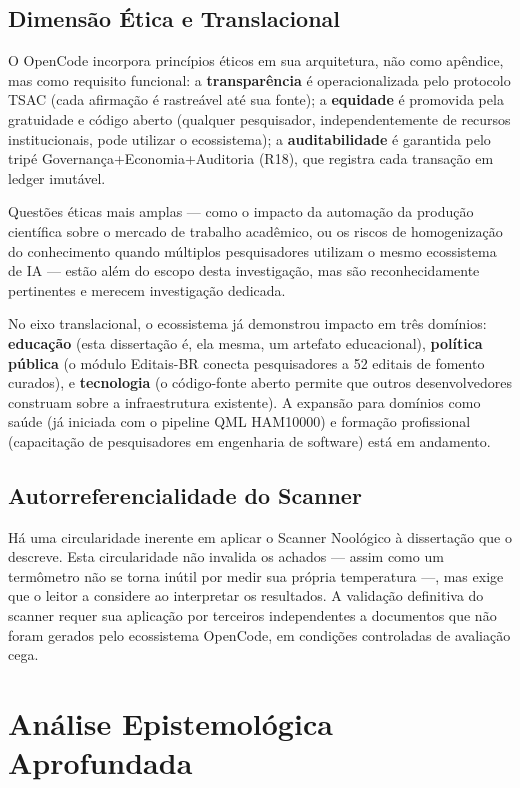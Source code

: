 \subsection{Dimensão Ética e Translacional}

O OpenCode incorpora princípios éticos em sua arquitetura, não como apêndice, mas como requisito funcional: a \textbf{transparência} é operacionalizada pelo protocolo TSAC (cada afirmação é rastreável até sua fonte); a \textbf{equidade} é promovida pela gratuidade e código aberto (qualquer pesquisador, independentemente de recursos institucionais, pode utilizar o ecossistema); a \textbf{auditabilidade} é garantida pelo tripé Governança+Economia+Auditoria (R18), que registra cada transação em ledger imutável.

Questões éticas mais amplas --- como o impacto da automação da produção científica sobre o mercado de trabalho acadêmico, ou os riscos de homogenização do conhecimento quando múltiplos pesquisadores utilizam o mesmo ecossistema de IA --- estão além do escopo desta investigação, mas são reconhecidamente pertinentes e merecem investigação dedicada.

No eixo translacional, o ecossistema já demonstrou impacto em três domínios: \textbf{educação} (esta dissertação é, ela mesma, um artefato educacional), \textbf{política pública} (o módulo Editais-BR conecta pesquisadores a 52 editais de fomento curados), e \textbf{tecnologia} (o código-fonte aberto permite que outros desenvolvedores construam sobre a infraestrutura existente). A expansão para domínios como saúde (já iniciada com o pipeline QML HAM10000) e formação profissional (capacitação de pesquisadores em engenharia de software) está em andamento.

\subsection{Autorreferencialidade do Scanner}

Há uma circularidade inerente em aplicar o Scanner Noológico à dissertação que o descreve. Esta circularidade não invalida os achados --- assim como um termômetro não se torna inútil por medir sua própria temperatura ---, mas exige que o leitor a considere ao interpretar os resultados. A validação definitiva do scanner requer sua aplicação por terceiros independentes a documentos que não foram gerados pelo ecossistema OpenCode, em condições controladas de avaliação cega.

\section{Análise Epistemológica Aprofundada}

